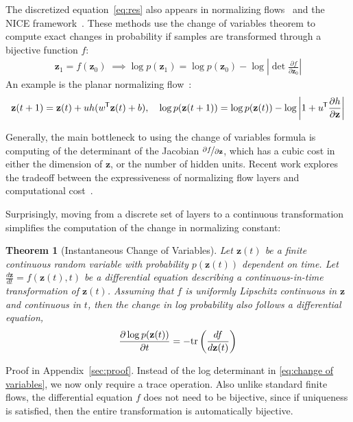 \documentclass{article}
\newtheorem{theorem}{Theorem}
\newcommand{\tr}{\textnormal{tr}}
\newcommand*{\tran}{^{\mkern-1.5mu\mathsf{T}}}
\newcommand{\vz}{\mathbf{z}}
\newcommand{\sol}{\vz}  %
\newcommand{\cnfx}{\sol}
\begin{document}
The discretized equation~\eqref{eq:res} also appears in normalizing flows~\citep{rezende2015variational} and the NICE framework~\citep{dinh2014nice}.
These methods use the change of variables theorem to compute exact changes in probability if samples are transformed through a bijective function $f$:
\begin{align}
{\cnfx}_1 = f({\cnfx}_0)\; \implies \log p({\cnfx}_1) = \log p({\cnfx}_0) - \log \left| \det \frac{\partial f}{\partial {\cnfx}_0} \right|
\label{eq:change of variables}
\end{align}
An example is the planar normalizing flow~\citep{rezende2015variational}:
\begin{align}
{\cnfx}(t+1) = {\cnfx}(t) + uh(w\tran{} {\cnfx}(t) + b),\quad \log p({\cnfx}(t+1)) = \log p({\cnfx}(t)) - \log \left| 1 +  u\tran{} \frac{\partial h}{\partial {\cnfx}} \right|
\end{align}

Generally, the main bottleneck to using the change of variables formula is computing of the determinant of the Jacobian $\nicefrac{\partial f}{\partial {\cnfx}}$, which has a cubic cost in either the dimension of $\cnfx$, or the number of hidden units.
Recent work explores the tradeoff between the expressiveness of normalizing flow layers and computational cost~\citep{kingma2016improved,tomczak2016improving,berg2018sylvester}.

Surprisingly, moving from a discrete set of layers to a continuous transformation simplifies the computation of the change in normalizing constant:

\begin{theorem}[Instantaneous Change of Variables]
Let ${\cnfx}(t)$ be a finite continuous random variable with probability $p({\cnfx}(t))$ dependent on time.
Let $\frac{d{\cnfx}}{dt} = f({\cnfx}(t), t)$ be a differential equation describing a continuous-in-time transformation of ${\cnfx}(t)$.
Assuming that $f$ is uniformly Lipschitz continuous in ${\cnfx}$ and continuous in $t$, then the change in log probability also follows a differential equation,
\begin{align}
\frac{\partial \log p({\cnfx}(t))}{\partial t} = -\tr\left(\frac{d f}{d {\cnfx}(t)}\right)
\end{align}
\end{theorem}
Proof in Appendix~\ref{sec:proof}.
Instead of the log determinant in \eqref{eq:change of variables}, we now only require a trace operation. %
Also unlike standard finite flows, the differential equation $f$ does not need to be bijective, since if uniqueness is satisfied, then the entire transformation is automatically bijective.
\end{document}
